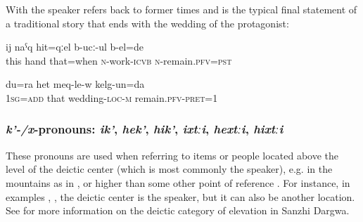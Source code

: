 With  the speaker refers back to former times and  is the typical final statement of a traditional story that ends with the wedding of the protagonist:

\begin{exe}
	\ex	\label{At that time this hand (of mine) was still working}
	\gll	ij	naˁq	hit=qːel	b-ucː-ul	b-el=de\\
		this	hand	that=when	\textsc{n}-work-\textsc{icvb}	\textsc{n}-remain.\textsc{pfv}=\textsc{pst}\\
	\glt	{}

	\ex	\label{I have been to this wedding as well.}
	\gll	du=ra	het	meq-le-w	kelg-un=da\\
		\textsc{1sg}=\textsc{add}	that	wedding-\textsc{loc}-\textsc{m}	remain.\textsc{pfv}-\textsc{pret=1}\\
	\glt	{}
\end{exe}



\subsubsection{\textit{k'-/x}-pronouns: \textit{ik'}, \textit{hek'}, \textit{hik'}, \textit{ixtːi}, \textit{hextːi}, \textit{hixtːi}}
\label{sssec:k-x-pronouns}

These pronouns are used when referring to items or people located above the level of the deictic center (which is most commonly the speaker), e.g. in the mountains as in ,  or higher than some other point of reference . For instance, in examples , , the deictic center is the speaker, but it can also be another location. See \citet{ForkerLTSanzhi} for more information on the deictic category of elevation in Sanzhi Dargwa.

